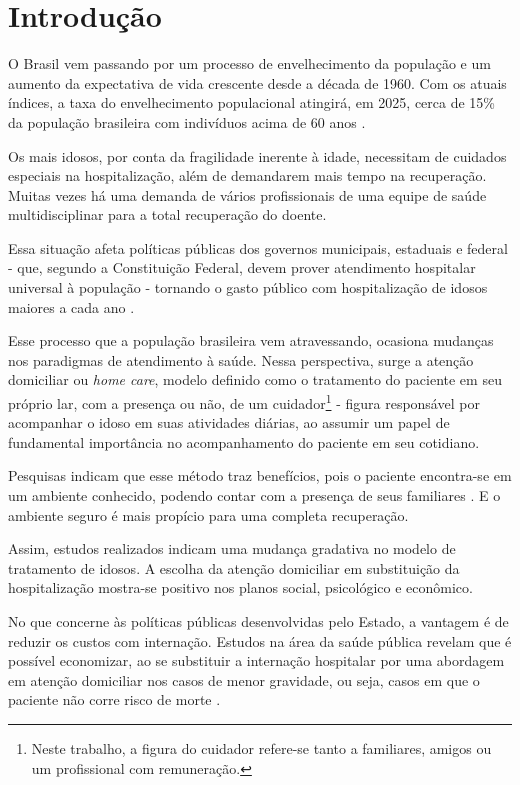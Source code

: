 \chapter{Introdução}\label{cap:introducao}

O Brasil vem passando por um processo de envelhecimento da população e
um aumento da expectativa de vida crescente desde a década de 1960. 
Com os atuais índices, a taxa do envelhecimento populacional atingirá, 
em 2025, cerca de 15\% da população brasileira com indivíduos acima 
de 60 anos \cite{gonccalves2006perfil}. 

Os mais idosos, por conta da fragilidade inerente à idade, necessitam de 
cuidados especiais na hospitalização, além de demandarem mais tempo na 
recuperação. Muitas vezes há uma demanda de vários profissionais de uma equipe 
de saúde multidisciplinar para a total recuperação do doente.

Essa situação afeta políticas públicas dos governos municipais, estaduais e
federal - que, segundo a Constituição Federal, devem prover atendimento
hospitalar universal à população - tornando o gasto público com hospitalização
de idosos maiores a cada ano \cite{da2013gastos}.

Esse processo que a população brasileira vem atravessando, ocasiona
mudanças  nos paradigmas de atendimento à saúde. Nessa perspectiva, surge a
atenção domiciliar ou \textit{home care}, modelo definido como o tratamento do
paciente em seu próprio lar, com a presença ou não, de um
cuidador\footnote{Neste trabalho, a figura do cuidador refere-se tanto a
familiares, amigos ou um profissional com remuneração.} - figura responsável por
acompanhar o idoso em suas atividades diárias, ao assumir um papel de
fundamental importância no acompanhamento do paciente em seu cotidiano.

Pesquisas indicam que esse método traz benefícios, pois o  paciente encontra-se
em um ambiente conhecido, podendo contar com a presença de seus familiares
\cite{hermann2007atendimento, day2010beneficios}. E o ambiente seguro é mais
propício para uma completa recuperação.

Assim, estudos realizados indicam uma mudança gradativa no modelo de tratamento
de idosos. A escolha da atenção domiciliar em substituição da hospitalização 
mostra-se positivo nos planos social, psicológico e econômico. 

No que concerne às políticas públicas desenvolvidas pelo Estado,  a vantagem é
de reduzir os custos com internação. Estudos na área da saúde pública revelam
que é possível economizar, ao se substituir a internação hospitalar por uma
abordagem em atenção domiciliar nos casos de menor gravidade,  ou seja, casos
em que o paciente não corre risco de morte \cite{bourdette1993health}.  

